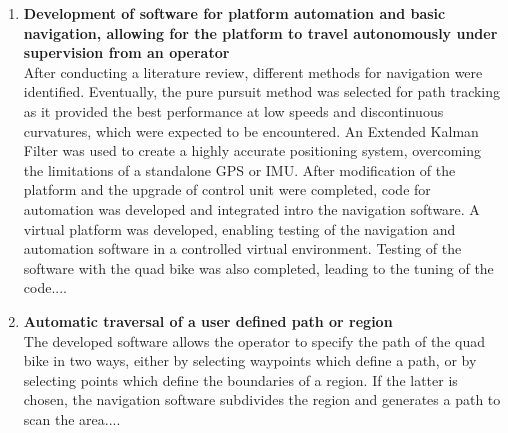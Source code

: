 \documentclass[main.tex]{subfiles}
\begin{document}
\begin{enumerate}
\item \textbf{Development of software for platform automation and basic navigation, allowing for the platform to travel autonomously under supervision from an operator}\\ 
After conducting a literature review, different methods for navigation were identified. Eventually, the pure pursuit method was selected for path tracking as it provided the best performance at low speeds and discontinuous curvatures, which were expected to be encountered. An Extended Kalman Filter was used to create a highly accurate positioning system, overcoming the limitations of a standalone GPS or IMU. After modification of the platform and the upgrade of control unit were completed, code for automation was developed and integrated intro the navigation software. A virtual platform was developed, enabling testing of the navigation and automation software in a controlled virtual environment. Testing of the software with the quad bike was also completed, leading to the tuning of the code....  

\item \textbf{Automatic traversal of a user defined path or region}\\ 
The developed software allows the operator to specify the path of the quad bike in two ways, either by selecting waypoints which define a path, or by selecting points which define the boundaries of a region. If the latter is chosen, the navigation software subdivides the region and generates a path to scan the area....


\end{enumerate}
\end{document}
